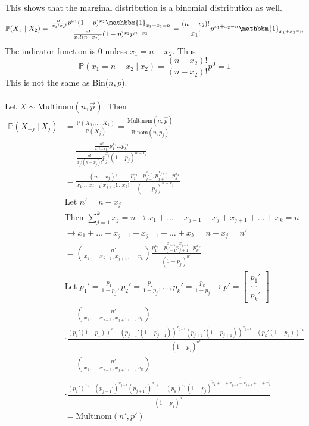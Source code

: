 \documentclass[12pt]{article}
\newcommand{\prob}[1]{\mathbb{P}(#1)}
\newcommand{\cprob}[2]{\mathbb{P}(#1 ~|~ #2)}
\newcommand{\indicator}[1]{\mathbbm{1}_{#1}}
\begin{document}
This shows that the marginal distribution is a binomial distribution as well. 
$$\cprob{X_1}{X_2} = \frac{\frac{n!}{x_1!x_2!}p^{x_1}(1 - p)^{x_2} \indicator{x_1 + x_2 = n}}{\frac{n!}{x_2!(n - x_2)!}(1 - p)^{x_2}p^{n - x_2}} = \frac{(n - x_2)!}{x_1!}p^{x_1 + x_2 - n} \indicator{x_1 + x_2 = n} $$ The indicator function is 0 unless $x_1 = n - x_2$. 
Thus $$\cprob{x_1 = n - x_2}{x_2} = \frac{(n - x_2)!}{(n - x_2)!}p^0 = 1 $$ This is not the same as Bin($n, p$). \\~\\
Let $X \sim \text{Multinom}(n, \vec{p})$. Then $$ \begin{aligned} 
\cprob{X_{-j}}{X_j} &= \frac{\prob{X_1, \dots, X_k}}{\prob{X_j}} = \frac{\text{Multinom}(n, \vec{p})}{\text{Binom}(n, p_j)} \\ &= \frac{\frac{n!}{x_1!\dots x_k!}p_1^{x_1}\dots p_k^{x_k}}{\frac{n!}{x_j!(n - x_j)!} p_j^{x_j}(1 - p_j)^{n - x_j}} \\ &= \frac{(n - x_j)!}{x_1!\dots x_{j - 1}!x_{j + 1}!\dots x_k!}\frac{p_1^{x_1}\dots p_{j - 1}^{x_{j - 1}}p_{j+1}^{x_{j+1}}\dots p_k^{x_k}}{(1 - p_j)^{n - x_j}} \\ &\text{Let }n' = n - x_j \\ &\text{Then } \sum_{j = 1}^k x_j = n \to x_1 + \dots + x_{j - 1} + x_j + x_{j +1} + \dots + x_k = n \\ &\to x_1 + \dots + x_{j - 1} + x_{j + 1} + \dots + x_k = n - x_j = n' \\ &= \binom{n'}{x_1, \dots, x_{j - 1}, x_{j + 1}, \dots, x_k} \frac{p_1^{x_1} \dots p_{j - 1}^{x_{j - 1}}p_{j+1}^{x_{j+1}}\dots p_k^{x_k}}{(1 - p_j)^{n'}} \\ &\text{Let } p_1' = \frac{p_1}{1 - p_j}, p_2' = \frac{p_2}{1 - p_j}, \dots, p_k' = \frac{p_k}{1 - p_j} \to p' = \begin{bmatrix} p_1' \\ \hdots \\ p_k' \end{bmatrix} \\ &= \binom{n'}{x_1, \dots, x_{j - 1}, x_{j +1}, \dots, x_k} \\ &\cdot \frac{(p_1'(1 - p_1))^{x_1}\dots (p_{j - 1}'(1 - p_{j - 1}))^{x_{j - 1}}(p_{j + 1}'(1 - p_{j + 1}))^{x_{j + 1}}\dots (p_k'(1 - p_k))^{x_k}}{(1 - p_j)^{n'}} \\ &= \binom{n'}{x_1, \dots, x_{j - 1}, x_{j + 1}, \dots, x_k} \\ &\cdot \frac{(p_1')^{x_1} \dots (p_{j - 1}')^{x_{j - 1}}(p_{j + 1}')^{x_{j + 1}} \dots (p_k)^{x_k} (1 - p_j)^{\overbrace{x_1 + \dots + x_{j-1} + x_{j+1} + \dots + x_k}^{n'}}}{(1 - p_j)^{n'}} \\ &= \text{Multinom}(n', p') \end{aligned} $$ 
\end{document}
